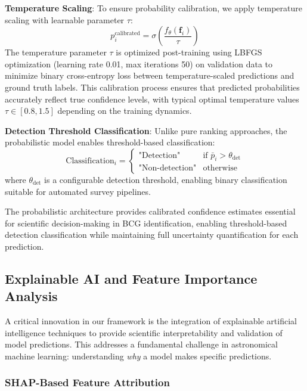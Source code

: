 \documentclass[twocolumn,10pt]{aastex631}
\begin{document}
\textbf{Temperature Scaling}: To ensure probability calibration, we apply temperature scaling \citep{Laves2019WellCalibratedMU} with learnable parameter $\tau$:
\begin{equation}
p_i^{\text{calibrated}} = \sigma\left(\frac{f_{\theta}(\mathbf{f}_i)}{\tau}\right)
\end{equation}
The temperature parameter $\tau$ is optimized post-training using LBFGS optimization (learning rate 0.01, max iterations 50) on validation data to minimize binary cross-entropy loss between temperature-scaled predictions and ground truth labels. This calibration process ensures that predicted probabilities accurately reflect true confidence levels, with typical optimal temperature values $\tau \in [0.8, 1.5]$ depending on the training dynamics.

\textbf{Detection Threshold Classification}: Unlike pure ranking approaches, the probabilistic model enables threshold-based classification:
\begin{equation}
\text{Classification}_i = \begin{cases}
\text{"Detection"} & \text{if } \bar{p}_i > \theta_{\text{det}} \\
\text{"Non-detection"} & \text{otherwise}
\end{cases}
\end{equation}
where $\theta_{\text{det}}$ is a configurable detection threshold, enabling binary classification suitable for automated survey pipelines.

The probabilistic architecture provides calibrated confidence estimates essential for scientific decision-making in BCG identification, enabling threshold-based detection classification while maintaining full uncertainty quantification for each prediction.

\subsection{Explainable AI and Feature Importance Analysis}

A critical innovation in our framework is the integration of explainable artificial intelligence techniques to provide scientific interpretability and validation of model predictions. This addresses a fundamental challenge in astronomical machine learning: understanding \emph{why} a model makes specific predictions.

\subsubsection{SHAP-Based Feature Attribution}
\end{document}
